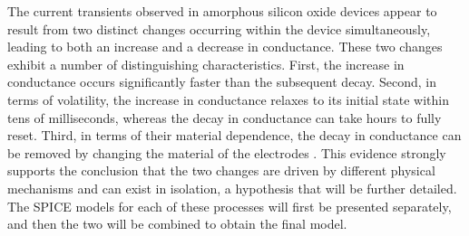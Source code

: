 

\noindent The current transients observed in amorphous silicon oxide devices appear to result from two distinct changes occurring within the device simultaneously, leading to both an increase and a decrease in conductance. These two changes exhibit a number of distinguishing characteristics. First, the increase in conductance occurs significantly faster than the subsequent decay. Second, in terms of volatility, the increase in conductance relaxes to its initial state within tens of milliseconds, whereas the decay in conductance can take hours to fully reset. Third, in terms of their material dependence, the decay in conductance can be removed by changing the material of the electrodes \cite{mannion2022current}. This evidence strongly supports the conclusion that the two changes are driven by different physical mechanisms and can exist in isolation, a hypothesis that will be further detailed. The SPICE models for each of these processes will first be presented separately, and then the two will be combined to obtain the final model.\\

